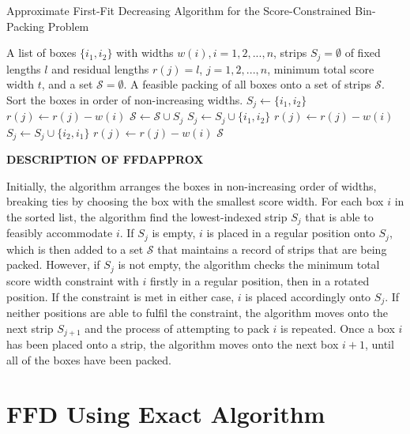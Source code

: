 \documentclass[oribibl]{llncs}
\begin{document}
\begin{algorithm}[H]
	\caption{\textcolor{OliveGreen}{Approximate First-Fit Decreasing Algorithm for the Score-Constrained Bin-Packing Problem}}
	\begin{algorithmic}[1]
	\Require A list of boxes $\{i_1, i_2\}$ with widths $w(i), i = 1, 2, ..., n$, strips $S_j = \emptyset$ of fixed lengths $l$ and residual lengths $r(j) = l$, $j = 1, 2, ...,n$, minimum total score width $t$, and a set $\mathcal{S} = \emptyset$.
	\Ensure A feasible packing of all boxes onto a set of strips $\mathcal{S}$.
	\State Sort the boxes in order of non-increasing widths.
				\State $S_j \gets \{i_1, i_2\}$
				\State $r(j) \gets r(j) - w(i)$
				\State $\mathcal{S} \gets \mathcal{S} \cup S_j$
				\Break
					\State $S_j \gets S_j \cup \{i_1, i_2\}$
					\State $r(j) \gets r(j) - w(i)$
					\Break
					\State $S_j \gets S_j \cup \{i_2, i_1\}$
					\State $r(j) \gets r(j) - w(i)$
					\Break
				\EndIf
			\EndIf
		\EndFor
	\EndFor
	\Return $\mathcal{S}$
	\end{algorithmic}	
\end{algorithm}

\textbf{\textcolor{Rhodamine}{DESCRIPTION OF FFDAPPROX}}

Initially, the algorithm arranges the boxes in non-increasing order of widths, breaking ties by choosing the box with the smallest score width. For each box $i$ in the sorted list, the algorithm find the lowest-indexed strip $S_j$ that is able to feasibly accommodate $i$. If $S_j$ is empty, $i$ is placed in a regular position onto $S_j$, which is then added to a set $\mathcal{S}$ that maintains a record of strips that are being packed. However, if $S_j$ is not empty, the algorithm checks the minimum total score width constraint with $i$ firstly in a regular position, then in a rotated position. If the constraint is met in either case, $i$ is placed accordingly onto $S_j$. If neither positions are able to fulfil the constraint, the algorithm moves onto the next strip $S_{j+1}$ and the process of attempting to pack $i$ is repeated. Once a box $i$ has been placed onto a strip, the algorithm moves onto the next box $i+1$, until all of the boxes have been packed. 



\section{FFD Using Exact Algorithm}
\end{document}
